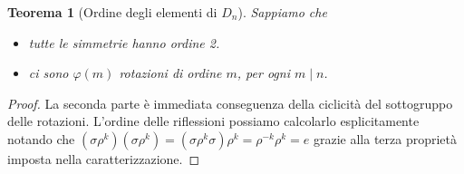 \documentclass[a4paper]{article}
\newtheorem{theorem}{Teorema}[section]
\theoremstyle{remark}
\theoremstyle{definition}
\begin{document}
\begin{multicols}{2}
\begin{theorem}[Ordine degli elementi di $ D_n $]
	Sappiamo che
	\begin{itemize}
		\item tutte le simmetrie hanno ordine 2.
		\item ci sono $ \varphi(m) $ rotazioni di ordine $ m $, per ogni $ m \mid n $.
	\end{itemize}
\end{theorem}
\begin{proof}
	La seconda parte è immediata conseguenza della ciclicità del sottogruppo delle rotazioni.
	L'ordine delle riflessioni possiamo calcolarlo esplicitamente notando che $ \left(\sigma\rho^k\right)\left(\sigma\rho^k\right) = \left(\sigma\rho^k\sigma\right)\rho^k = \rho^{-k}\rho^{k} = e $ grazie alla terza proprietà imposta nella caratterizzazione.
\end{proof}


\end{multicols}
\end{document}

